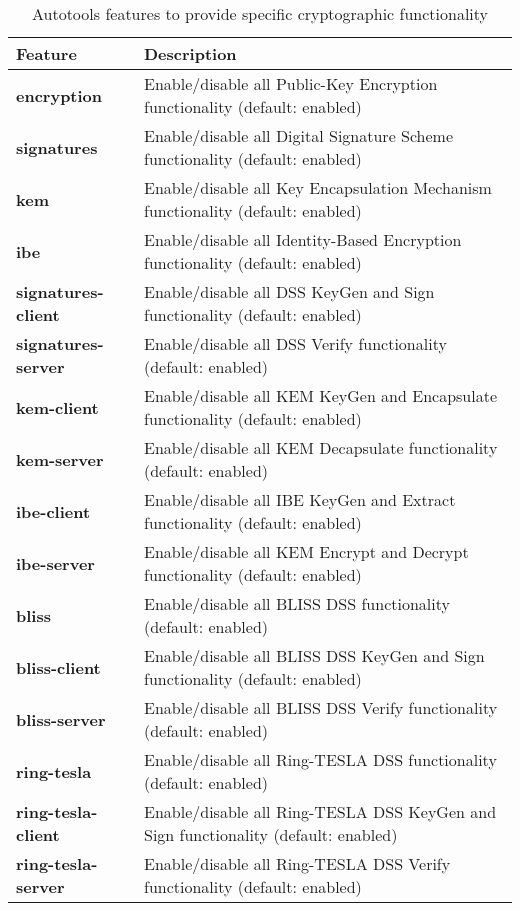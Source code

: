 \begin{table}[h]
\caption{Autotools features to provide specific cryptographic functionality}
\label{table:autotools_crypto_scheme_switches}
\begin{tabularx}{\textwidth}{l p{13cm}}
\toprule
\textbf{Feature} &\textbf{Description}  \\
\midrule
\textbf{encryption} &Enable/disable all Public-Key Encryption functionality (default: enabled) \\
\midrule
\textbf{signatures} &Enable/disable all Digital Signature Scheme functionality (default: enabled) \\
\midrule
\textbf{kem} &Enable/disable all Key Encapsulation Mechanism functionality (default: enabled) \\
\midrule
\textbf{ibe} &Enable/disable all Identity-Based Encryption functionality (default: enabled) \\
\midrule
\textbf{signatures-client} &Enable/disable all DSS KeyGen and Sign functionality (default: enabled) \\
\midrule
\textbf{signatures-server} &Enable/disable all DSS Verify functionality (default: enabled) \\
\midrule
\textbf{kem-client} &Enable/disable all KEM KeyGen and Encapsulate functionality (default: enabled) \\
\midrule
\textbf{kem-server} &Enable/disable all KEM Decapsulate functionality (default: enabled) \\
\midrule
\textbf{ibe-client} &Enable/disable all IBE KeyGen and Extract functionality (default: enabled) \\
\midrule
\textbf{ibe-server} &Enable/disable all KEM Encrypt and Decrypt functionality (default: enabled) \\
\midrule
\textbf{bliss} &Enable/disable all BLISS DSS functionality (default: enabled) \\
\midrule
\textbf{bliss-client} &Enable/disable all BLISS DSS KeyGen and Sign functionality (default: enabled) \\
\midrule
\textbf{bliss-server} &Enable/disable all BLISS DSS Verify functionality (default: enabled) \\
\midrule
\textbf{ring-tesla} &Enable/disable all Ring-TESLA DSS functionality (default: enabled) \\
\midrule
\textbf{ring-tesla-client} &Enable/disable all Ring-TESLA DSS KeyGen and Sign functionality (default: enabled) \\
\midrule
\textbf{ring-tesla-server} &Enable/disable all Ring-TESLA DSS Verify functionality (default: enabled) \\

\end{tabularx}
\end{table}
